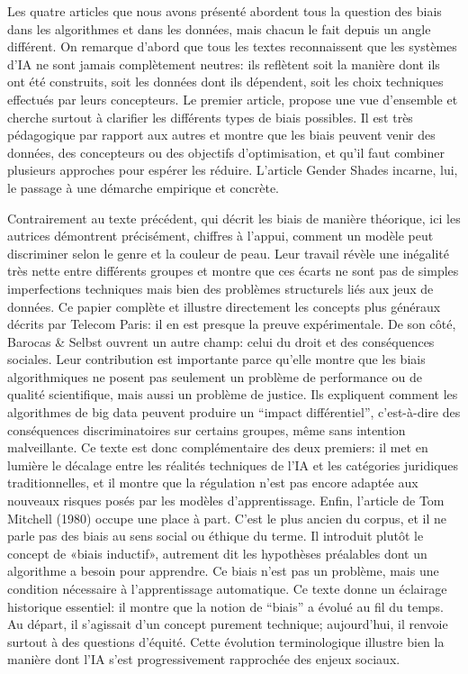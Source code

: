 \documentclass{article}
\begin{document}
Les quatre articles que nous avons présenté abordent tous la question des biais dans les algorithmes et dans les données, mais chacun le fait depuis un angle différent. On remarque d’abord que tous les textes reconnaissent que les systèmes d’IA ne sont jamais complètement neutres: ils reflètent soit la manière dont ils ont été construits, soit les données dont ils dépendent, soit les choix techniques effectués par leurs concepteurs. Le premier article, propose une vue d’ensemble et cherche surtout à clarifier les différents types de biais possibles. Il est très pédagogique par rapport aux autres et montre que les biais peuvent venir des données, des concepteurs ou des objectifs d’optimisation, et qu’il faut combiner plusieurs approches pour espérer les réduire. L’article Gender Shades incarne, lui, le passage à une démarche empirique et concrète. 

Contrairement au texte précédent, qui décrit les biais de manière théorique, ici les autrices démontrent précisément, chiffres à l’appui, comment un modèle peut discriminer selon le genre et la couleur de peau. Leur travail révèle une inégalité très nette entre différents groupes et montre que ces écarts ne sont pas de simples imperfections techniques mais bien des problèmes structurels liés aux jeux de données. Ce papier complète et illustre directement les concepts plus généraux décrits par Telecom Paris: il en est presque la preuve expérimentale. De son côté, Barocas \& Selbst ouvrent un autre champ: celui du droit et des conséquences sociales. Leur contribution est importante parce qu’elle montre que les biais algorithmiques ne posent pas seulement un problème de performance ou de qualité scientifique, mais aussi un problème de justice. Ils expliquent comment les algorithmes de big data peuvent produire un “impact différentiel”, c’est-à-dire des conséquences discriminatoires sur certains groupes, même sans intention malveillante. Ce texte est donc complémentaire des deux premiers: il met en lumière le décalage entre les réalités techniques de l’IA et les catégories juridiques traditionnelles, et il montre que la régulation n’est pas encore adaptée aux nouveaux risques posés par les modèles d’apprentissage.	Enfin, l’article de Tom Mitchell (1980) occupe une place à part. C’est le plus ancien du corpus, et il ne parle pas des biais au sens social ou éthique du terme. Il introduit plutôt le concept de «biais inductif», autrement dit les hypothèses préalables dont un algorithme a besoin pour apprendre. Ce biais n’est pas un problème, mais une condition nécessaire à l’apprentissage automatique. Ce texte donne un éclairage historique essentiel: il montre que la notion de “biais” a évolué au fil du temps. Au départ, il s’agissait d’un concept purement technique; aujourd’hui, il renvoie surtout à des questions d’équité. Cette évolution terminologique illustre bien la manière dont l’IA s’est progressivement rapprochée des enjeux sociaux.
\end{document}
